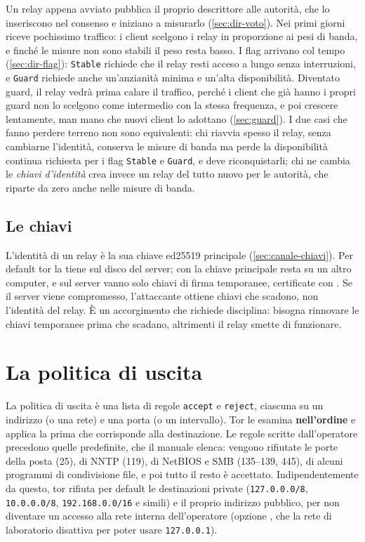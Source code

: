 Un relay appena avviato pubblica il proprio descrittore alle autorità, che lo inseriscono nel consenso e iniziano a misurarlo (\cref{sec:dir-voto}). Nei primi giorni riceve pochissimo traffico: i client scelgono i relay in proporzione ai pesi di banda, e finché le misure non sono stabili il peso resta basso. I flag arrivano col tempo (\cref{sec:dir-flag}): \texttt{Stable} richiede che il relay resti acceso a lungo senza interruzioni, e \texttt{Guard} richiede anche un'anzianità minima e un'alta disponibilità. Diventato guard, il relay vedrà prima calare il traffico, perché i client che già hanno i propri guard non lo scelgono come intermedio con la stessa frequenza, e poi crescere lentamente, man mano che nuovi client lo adottano (\cref{sec:guard}). I due casi che fanno perdere terreno non sono equivalenti: chi riavvia spesso il relay, senza cambiarne l'identità, conserva le misure di banda ma perde la disponibilità continua richiesta per i flag \texttt{Stable} e \texttt{Guard}, e deve riconquistarli; chi ne cambia le \emph{chiavi d'identità} crea invece un relay del tutto nuovo per le autorità, che riparte da zero anche nelle misure di banda.

\subsection{Le chiavi}

L'identità di un relay è la sua chiave ed25519 principale (\cref{sec:canale-chiavi}). Per default tor la tiene sul disco del server; con  la chiave principale resta su un altro computer, e sul server vanno solo chiavi di firma temporanee, certificate con . Se il server viene compromesso, l'attaccante ottiene chiavi che scadono, non l'identità del relay. È un accorgimento che richiede disciplina: bisogna rinnovare le chiavi temporanee prima che scadano, altrimenti il relay smette di funzionare.

\section{La politica di uscita}\label{sec:relay-exitpolicy}

La politica di uscita è una lista di regole \texttt{accept} e \texttt{reject}, ciascuna su un indirizzo (o una rete) e una porta (o un intervallo). Tor le esamina \textbf{nell'ordine} e applica la prima che corrisponde alla destinazione. Le regole scritte dall'operatore precedono quelle predefinite, che il manuale elenca: vengono rifiutate le porte della posta (25), di NNTP (119), di NetBIOS e SMB (135--139, 445), di alcuni programmi di condivisione file, e poi tutto il resto è accettato. Indipendentemente da questo, tor rifiuta per default le destinazioni private (\texttt{127.0.0.0/8}, \texttt{10.0.0.0/8}, \texttt{192.168.0.0/16} e simili) e il proprio indirizzo pubblico, per non diventare un accesso alla rete interna dell'operatore (opzione , che la rete di laboratorio disattiva per poter usare \texttt{127.0.0.1}).

